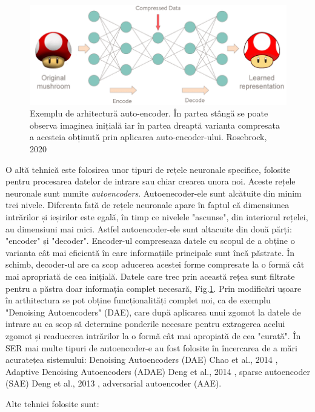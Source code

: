 \documentclass[a4paper,12pt]{book}
\begin{document}
						\begin{figure}[h]
							\centering
							\includegraphics[scale=0.4]{mushroom_encoder}
							\caption{Exemplu de arhitectură auto-encoder. În partea stângă se poate observa imaginea inițială iar în partea dreaptă varianta compresata a acesteia obținută prin aplicarea auto-encoder-ului. Rosebrock, 2020 \cite{auto}}
							\label{fig:ae}							
						\end{figure}		
						O altă tehnică este folosirea unor tipuri de rețele neuronale specifice, folosite pentru procesarea datelor de intrare sau chiar crearea unora noi. Aceste rețele neuronale sunt numite \textit{autoencoders}. Autoenecoder-ele sunt alcătuite din minim trei nivele. Diferența față de rețele neuronale apare în faptul că dimensiunea intrărilor și ieșirilor este egală, în timp ce nivelele "ascunse", din interiorul rețelei, au dimensiuni mai mici. Astfel autoencoder-ele sunt altacuite din două părți: "encoder" și "decoder". Encoder-ul compreseaza datele cu scopul de a obține o varianta cât mai eficientă în care informațiile principale sunt încă păstrate. În schimb, decoder-ul are ca scop aducerea acestei forme compresate la o formă cât mai apropriată de cea inițială. Datele care trec prin această rețea sunt filtrate pentru a păstra doar informația complet necesară, Fig.\ref{fig:ae}. Prin modificări ușoare în arthitectura se pot obține funcționalități complet noi, ca de exemplu "Denoising Autoencoders" (DAE), care după aplicarea unui zgomot la datele de intrare au ca scop să determine ponderile necesare pentru extragerea acelui zgomot și readucerea intrărilor la o formă cât mai apropiată de cea "curată". În SER mai multe tipuri de autoencoder-e au fost folosite în încercarea de a mări acuratețea sistemului: Denoising Autoencoders (DAE) Chao et al., 2014 \cite{dae}, Adaptive Denoising Autoencoders (ADAE) Deng et al., 2014 \cite{adae}, sparse autoencoder (SAE) Deng et al., 2013 \cite{sdae}, adversarial autoencoder (AAE). \par
						Alte tehnici folosite sunt: 
\end{document}
